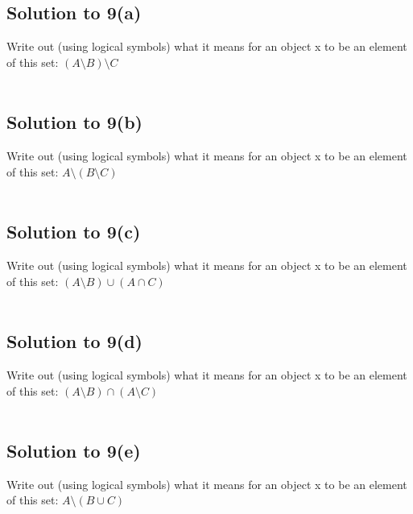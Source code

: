 \documentclass{scrartcl}
\begin{document}
    \subsection*{Solution to 9(a)}
        Write out (using logical symbols) what it means for an object x to be an element of this set: $(A \setminus B) \setminus C$

        \begin{align*}
        \end{align*}

    \subsection*{Solution to 9(b)}
        Write out (using logical symbols) what it means for an object x to be an element of this set: $A \setminus (B \setminus C)$

        \begin{align*}
        \end{align*}

    \subsection*{Solution to 9(c)}
        Write out (using logical symbols) what it means for an object x to be an element of this set: $(A \setminus B) \cup (A \cap C)$

        \begin{align*}
        \end{align*}

    \subsection*{Solution to 9(d)}
        Write out (using logical symbols) what it means for an object x to be an element of this set: $(A \setminus B) \cap (A \setminus C)$

        \begin{align*}
        \end{align*}

    \subsection*{Solution to 9(e)}
        Write out (using logical symbols) what it means for an object x to be an element of this set: $A \setminus (B \cup C)$

        \begin{align*}
        \end{align*}
\end{document}

